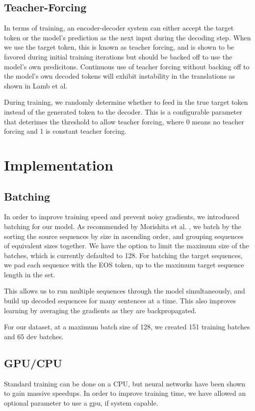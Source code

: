\documentclass[twoside,twocolumn]{article}
\begin{document}
\subsection{Teacher-Forcing}
In terms of training, an encoder-decoder system can either accept the target
token or the model's prediction as the next input during the decoding step.
When we use the target token, this is known as teacher forcing, and is
shown to be favored during initial training iterations but should be backed
off to use the model's own predicitons. Continuous use of teacher forcing
without backing off to the model's own decoded tokens will exhibit instability
in the translations as shown in Lamb et al. \cite{lamb2016professor}

During training, we randomly determine whether to feed in the true target
token instead of the generated token to the decoder. This is a configurable
parameter that deterimes the threshold to allow teacher forcing, where 0 means
no teacher forcing and 1 is constant teacher forcing.
\section{Implementation}
\label{sec:implementation}
\subsection{Batching}
In order to improve training speed and prevent noisy gradients, we introduced
batching for our model. As recommended by Morishita et al.
\cite{morishita2017empirical}, we batch by the sorting the source sequences by
size in ascending order, and grouping sequences of equivalent sizes together.
We have the option to limit the maximum size of the batches, which is currently
defaulted to 128. For batching the target sequences, we pad each sequence with
the EOS token, up to the maximum target sequence length in the set.

This allows us to run multiple sequences through the model simultaneously,
and build up decoded sequences for many sentences at a time. This also improves
learning by averaging the gradients as they are backpropagated.

For our dataset, at a maximum batch size of 128, we created 151 training
batches and 65 dev batches.
\subsection{GPU/CPU}
Standard training can be done on a CPU, but neural networks have been shown to
gain massive speedups. In order to improve training time,
we have allowed an optional parameter to use a gpu, if system capable.
\end{document}

